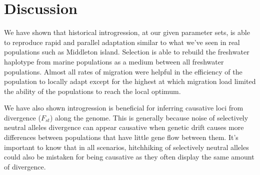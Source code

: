 \documentclass{article}
\begin{document}

\section*{Discussion}








We have shown that historical introgression, at our given parameter sets, is able to reproduce rapid and parallel adaptation similar to what we've seen in real populations such as Middleton island. 
Selection is able to rebuild the freshwater haplotype from marine populations as a medium between all freshwater populations. 
Almost all rates of migration were helpful in the efficiency of the population to locally adapt except for the highest at which migration load limited the ability of the populations to reach the local optimum. 



We have also shown introgression is beneficial for inferring causative loci from divergence ($F_{st}$) along the genome. 
This is generally because noise of selectively neutral alleles divergence can appear causative when genetic drift causes more 
differences between populations that have little gene flow between them.
It's important to know that in all scenarios, hitchhiking of selectively neutral alleles could also be 
mistaken for being causative as they often display the same amount of divergence.
\end{document}
